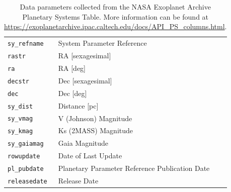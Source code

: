 \documentclass[preprint]{aastex631}
\begin{document}
\begin{table}
\begin{tabular}{ll}
    \verb|sy_refname| & System Parameter Reference \\
    \verb|rastr| & RA [sexagesimal] \\
    \verb|ra| & RA [deg] \\
    \verb|decstr| & Dec [sexagesimal] \\
    \verb|dec| & Dec [deg] \\
    \verb|sy_dist| & Distance [pc] \\
    \verb|sy_vmag| & V (Johnson) Magnitude \\
    \verb|sy_kmag| & Ks (2MASS) Magnitude \\
    \verb|sy_gaiamag| & Gaia Magnitude \\
    \verb|rowupdate| & Date of Last Update \\
    \verb|pl_pubdate| & Planetary Parameter Reference Publication Date \\
    \verb|releasedate| & Release Date \\
    \hline
  \end{tabular}
  \caption{Data parameters collected from the NASA Exoplanet Archive Planetary Systems Table. More information can be found at \url{https://exoplanetarchive.ipac.caltech.edu/docs/API_PS_columns.html}.}
  \label{tab:data_parameters}
\end{table}


\citep{weiGSimpGibbsSampler2018}


\end{document}
